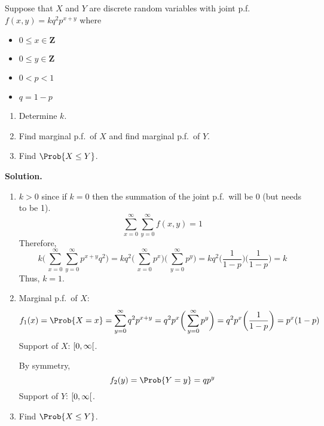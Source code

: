 \begin{Example}{}{}
    Suppose that $ X $ and $ Y $ are discrete random variables
    with joint p.f.\ $ f(x,y)=kq^2 p^{x+y} $ where
    \begin{itemize}
        \item $ 0\le x\in\mathbf{Z}$
        \item $ 0\le y\in\mathbf{Z} $
        \item $ 0<p<1 $
        \item $ q=1-p $
    \end{itemize}
    \begin{enumerate}[label=(\roman*)]
        \item Determine $ k $.
        \item Find marginal p.f.\ of $ X $ and
              find marginal p.f.\ of $ Y $.
        \item Find $ \Prob{X\le Y} $.
    \end{enumerate}
    \textbf{Solution.}
    \begin{enumerate}[label=(\roman*)]
        \item $ k>0 $ since if $ k=0 $ then the summation
              of the joint p.f.\ will be 0 (but needs to be 1).
              \[\sum\limits_{x=0}^{\infty}
                  \sum\limits_{y=0}^{\infty} f(x,y)=1\]
              Therefore,
              \[k\biggl(\,\sum\limits_{x=0}^{\infty}
                  \sum\limits_{y=0}^{\infty} p^{x+y}q^2\biggr)=
                  kq^2\biggl(\,\sum\limits_{x=0}^{\infty} p^x\biggr)
                  \biggl(\,\sum\limits_{y=0}^{\infty}p^y\biggr)=kq^2
                  \biggl(\frac{1}{1-p}  \biggr)\biggl( \frac{1}{1-p} \biggr)=k
              \]
              Thus, $ k=1 $.
        \item Marginal p.f.\ of $ X $:
              \[ f_1(x)=\Prob{X=x}=
                  \sum\limits_{y=0}^{\infty} q^2p^{x+y}=
                  q^2 p^x
                  \biggl(\,\sum\limits_{y=0}^{\infty} p^y \biggr)
                  =q^2 p^x \biggl( \frac{1}{1-p}  \biggr)=p^x(1-p) \]
              Support of $ X $: $ \interval[open right]{0}{\infty} $.

              By symmetry,
              \[ f_2(y)=\Prob{Y=y}=qp^y \]
              Support of $ Y $: $ \interval[open right]{0}{\infty} $.
        \item Find $ \Prob{X\le Y} $.


\end{enumerate}
\end{Example}
